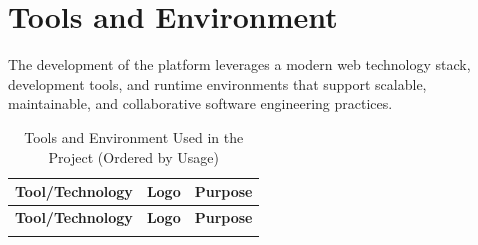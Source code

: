 \section{Tools and Environment}
The development of the platform leverages a modern web technology stack, development tools, and runtime environments that support scalable, maintainable, and collaborative software engineering practices.

\begin{longtable}{|m{3.5cm}|m{4cm}|m{6.5cm}|}
    \caption{Tools and Environment Used in the Project (Ordered by Usage)} \label{tab:tools_env_ordered} \\
    \hline
    \textbf{Tool/Technology} & \textbf{Logo} & \textbf{Purpose} \\
    \hline
    \endfirsthead
    
    \hline
    \textbf{Tool/Technology} & \textbf{Logo} & \textbf{Purpose} \\
    \hline
    \endhead
    
    \endfoot
    

\end{longtable}
